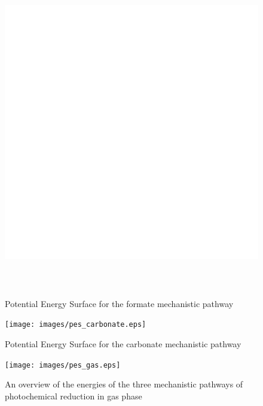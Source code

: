 \begin{landscape}
\begin{figure}[!htbp]
 \begin{center}
  \includegraphics[clip=true, height=144mm, keepaspectratio]{images/pes_formate.eps}
 \end{center}
\caption{Potential Energy Surface for the formate mechanistic pathway}
\label{fig.pes_formate}

\end{figure} 
\begin{figure}[!htbp]
 \begin{center}
  \texttt{[image: images/pes\_carbonate.eps]}
 \end{center}
\caption{Potential Energy Surface for the carbonate mechanistic pathway}
\label{fig.pes_carbonate}

\end{figure} 
\begin{figure}[!htbp]
 \begin{center}
  \texttt{[image: images/pes\_gas.eps]}
 \end{center}
\caption{An overview of the energies of the three mechanistic pathways of photochemical  reduction in gas phase}
\label{fig.pes_gas}
\end{figure} 


\end{landscape}
